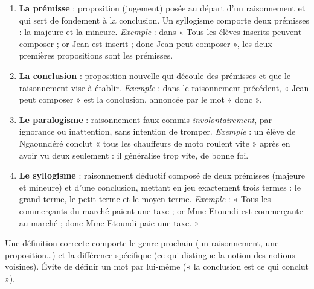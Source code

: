 \documentclass[11pt]{article}
\begin{document}
\begin{corrige}
\begin{enumerate}
\item \textbf{La prémisse} : proposition (jugement) posée au départ d'un raisonnement et qui sert de fondement à la conclusion. Un syllogisme comporte deux prémisses : la majeure et la mineure. \emph{Exemple} : dans « Tous les élèves inscrits peuvent composer ; or Jean est inscrit ; donc Jean peut composer », les deux premières propositions sont les prémisses.
\item \textbf{La conclusion} : proposition nouvelle qui découle des prémisses et que le raisonnement vise à établir. \emph{Exemple} : dans le raisonnement précédent, « Jean peut composer » est la conclusion, annoncée par le mot « donc ».
\item \textbf{Le paralogisme} : raisonnement faux commis \emph{involontairement}, par ignorance ou inattention, sans intention de tromper. \emph{Exemple} : un élève de Ngaoundéré conclut « tous les chauffeurs de moto roulent vite » après en avoir vu deux seulement : il généralise trop vite, de bonne foi.
\item \textbf{Le syllogisme} : raisonnement déductif composé de deux prémisses (majeure et mineure) et d'une conclusion, mettant en jeu exactement trois termes : le grand terme, le petit terme et le moyen terme. \emph{Exemple} : « Tous les commerçants du marché paient une taxe ; or Mme Etoundi est commerçante au marché ; donc Mme Etoundi paie une taxe. »
\end{enumerate}
\end{corrige}

\begin{attention}
Une définition correcte comporte le genre prochain (un raisonnement, une proposition\ldots) et la différence spécifique (ce qui distingue la notion des notions voisines). Évite de définir un mot par lui-même (« la conclusion est ce qui conclut »).
\end{attention}
\end{document}
